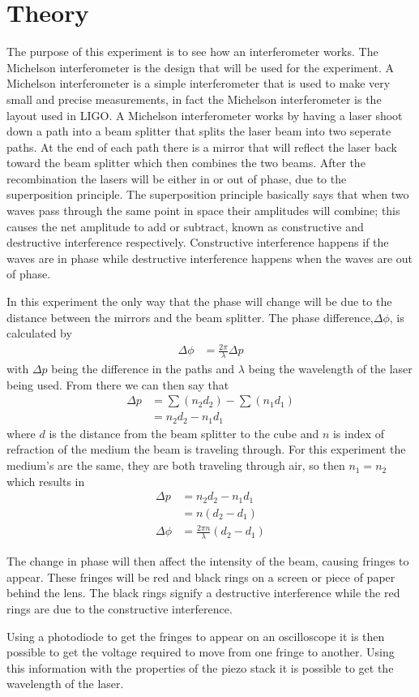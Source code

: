 \section{Theory}

The purpose of this experiment is to see how an interferometer works. The
Michelson interferometer is the design that will be used for the experiment. A
Michelson interferometer is a simple interferometer that is used to make very
small and precise measurements, in fact the Michelson interferometer is the
layout used in LIGO\@. A Michelson interferometer works by having a laser shoot
down a path into a beam splitter that splits the laser beam into two seperate
paths. At the end of each path there is a mirror that will reflect the laser
back toward the beam splitter which then combines the two beams. After the
recombination the lasers will be either in or out of phase, due to the
superposition principle. The superposition principle basically says that when
two waves pass through the same point in space their amplitudes will combine;
this causes the net amplitude to add or subtract, known as constructive and
destructive interference respectively. Constructive interference happens if the
waves are in phase while destructive interference happens when the waves are out
of phase.

In this experiment the only way that the phase will change will be due to the distance between the mirrors and the beam splitter. The phase difference,$\Delta \phi$, is calculated by 
	\begin{align}
		\nonumber \Delta \phi &=\frac{2\pi}{\lambda} \Delta p
	\end{align}
with $\Delta p$ being the difference in the paths and $\lambda$ being the wavelength of the laser being used. From there we can then say that 
	\begin{align}
		\nonumber \Delta p &=\sum(n_2 d_2)-\sum(n_1 d_1) \\
		\nonumber		&=n_2 d_2 - n_1 d_1
	\end{align} 
where $d$ is the distance from the beam splitter to the cube and $n$ is index of refraction of the medium the beam is traveling through. For this experiment the medium's are the same, they are both traveling through air, so then $n_1=n_2$ which results in
	\begin{align}
		\nonumber \Delta p &= n_2 d_2 - n_1 d_1 \\
		\nonumber 	&= n(d_2 - d_1) \\
		\nonumber \Delta \phi &=\frac{2\pi n}{\lambda} (d_2 - d_1)
	\end{align}

The change in phase will then affect the intensity of the beam, causing fringes to appear. These fringes will be red and black rings on a screen or piece of paper behind the lens. The black rings signify a destructive interference while the red rings are due to the constructive interference. 

Using a photodiode to get the fringes to appear on an oscilloscope it is then possible to get the voltage required to move from one fringe to another. Using this information with the properties of the piezo stack it is possible to get the wavelength of the laser. 


